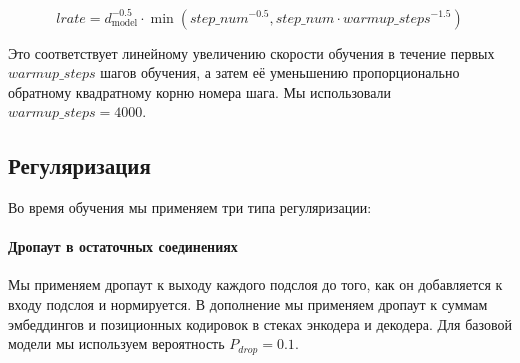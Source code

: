 \documentclass{article}
\newcommand{\dmodel}{d_{\text{model}}}
\begin{document}
\begin{equation}
lrate = \dmodel^{-0.5} \cdot
  \min({step\_num}^{-0.5},
    {step\_num} \cdot {warmup\_steps}^{-1.5})
\end{equation}

Это соответствует линейному увеличению скорости обучения в течение первых $warmup\_steps$ шагов обучения, а затем её уменьшению пропорционально обратному квадратному корню номера шага. Мы использовали $warmup\_steps=4000$.

\subsection{Регуляризация} \label{sec:reg}

Во время обучения мы применяем три типа регуляризации: 
\paragraph{Дропаут в остаточных соединениях} Мы применяем дропаут \citep{srivastava2014dropout} к выходу каждого подслоя до того, как он добавляется к входу подслоя и нормируется. В дополнение мы применяем дропаут к суммам эмбеддингов и позиционных кодировок в стеках энкодера и декодера. Для базовой модели мы используем вероятность $P_{drop}=0.1$.


\end{document}
